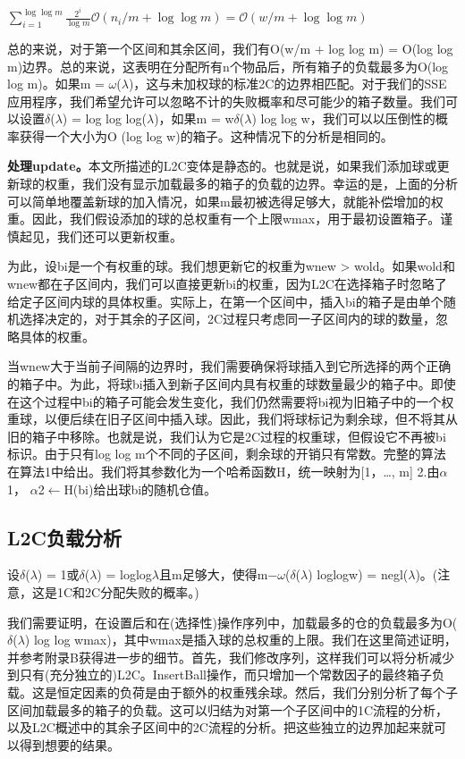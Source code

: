 \documentclass[UTF8]{article}
\begin{document}
$\sum_{i=1}^{\log \log m} \frac{2^i}{\log m} \mathcal{O}\left(n_i / m+\log \log m\right)=\mathcal{O}(w / m+\log \log m)$

总的来说，对于第一个区间和其余区间，我们有O(w/m + log log m) = O(log log m)边界。总的来说，这表明在分配所有n个物品后，所有箱子的负载最多为O(log log m)。如果m = $\omega$($\lambda$)，这与未加权球的标准2C的边界相匹配。对于我们的SSE应用程序，我们希望允许可以忽略不计的失败概率和尽可能少的箱子数量。我们可以设置$\delta$($\lambda$) = log log log($\lambda$)，如果m = w$\delta$($\lambda$) log log w，我们可以以压倒性的概率获得一个大小为O (log log w)的箱子。这种情况下的分析是相同的。

\textbf{处理update。}本文所描述的L2C变体是静态的。也就是说，如果我们添加球或更新球的权重，我们没有显示加载最多的箱子的负载的边界。幸运的是，上面的分析可以简单地覆盖新球的加入情况，如果m最初被选得足够大，就能补偿增加的权重。因此，我们假设添加的球的总权重有一个上限wmax，用于最初设置箱子。谨慎起见，我们还可以更新权重。

为此，设bi是一个有权重的球。我们想更新它的权重为wnew > wold。如果wold和wnew都在子区间内，我们可以直接更新bi的权重，因为L2C在选择箱子时忽略了给定子区间内球的具体权重。实际上，在第一个区间中，插入bi的箱子是由单个随机选择决定的，对于其余的子区间，2C过程只考虑同一子区间内的球的数量，忽略具体的权重。

当wnew大于当前子间隔的边界时，我们需要确保将球插入到它所选择的两个正确的箱子中。为此，将球bi插入到新子区间内具有权重的球数量最少的箱子中。即使在这个过程中bi的箱子可能会发生变化，我们仍然需要将bi视为旧箱子中的一个权重球，以便后续在旧子区间中插入球。因此，我们将球标记为剩余球，但不将其从旧的箱子中移除。也就是说，我们认为它是2C过程的权重球，但假设它不再被bi标识。由于只有log log m个不同的子区间，剩余球的开销只有常数。完整的算法在算法1中给出。我们将其参数化为一个哈希函数H，统一映射为[1，…, m] 2.由$\alpha$1， $\alpha$2$\leftarrow$H(bi)给出球bi的随机仓值。

\subsection{L2C负载分析}
设$\delta$($\lambda$) = 1或$\delta$($\lambda$) = loglog$\lambda$且m足够大，使得m−$\omega$($\delta$($\lambda$) loglogw) = negl($\lambda$)。(注意，这是1C和2C分配失败的概率。)

我们需要证明，在设置后和在(选择性)操作序列中，加载最多的仓的负载最多为O($\delta$($\lambda$) log log wmax)，其中wmax是插入球的总权重的上限。我们在这里简述证明，并参考附录B获得进一步的细节。首先，我们修改序列，这样我们可以将分析减少到只有(充分独立的)L2C。InsertBall操作，而只增加一个常数因子的最终箱子负载。这是恒定因素的负荷是由于额外的权重残余球。然后，我们分别分析了每个子区间加载最多的箱子的负载。这可以归结为对第一个子区间中的1C流程的分析，以及L2C概述中的其余子区间中的2C流程的分析。把这些独立的边界加起来就可以得到想要的结果。
\end{document}
